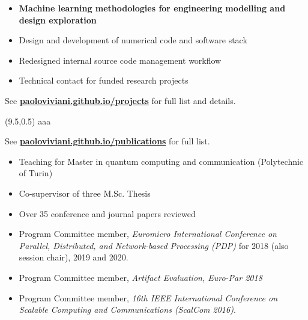 \documentclass[10pt,a4paper]{altacv}
\begin{document}
\divider

\begin{itemize}
\item \textbf{Machine learning methodologies for engineering modelling and design exploration}
\item Design and development of numerical code and software stack
\item Redesigned internal source code management workflow
\item Technical contact for funded research projects
\end{itemize}

\divider

See \href{http://paoloviviani.github.io/projects}{\color{accent}\textbf{paoloviviani.github.io/projects}} for full list and details.
\medskip


\clearpage

\vspace{0.5cm}
\begin{textblock}{10}(9.5,0.5)
  \centering
	aaa
  \vspace{278mm}
\end{textblock}

\renewcommand*{\bibfont}{\small}
See \href{https://paoloviviani.github.io/publications}{\color{accent}\textbf{paoloviviani.github.io/publications}} for full list.
\medskip
\medskip
\nocite{*}
\medskip
\printbibliography[heading=none,sorting=none]

\divider

\begin{itemize}
  \item Teaching for Master in quantum computing and communication (Polytechnic of Turin)
  \item Co-supervisor of three M.Sc. Thesis
  \item Over 35 conference and journal papers reviewed
  \item Program Committee member, \textit{Euromicro International Conference on Parallel, Distributed, and Network-based Processing (PDP)} for 2018 (also session chair), 2019 and 2020.
  \item Program Committee member, \textit{Artifact Evaluation, Euro-Par 2018}
  \item Program Committee member, \textit{16th IEEE International Conference on Scalable Computing and Communications (ScalCom 2016)}.
\end{itemize}
\end{document}
